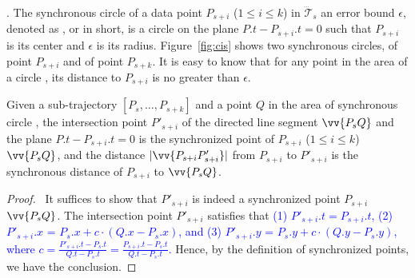 


. The synchronous circle of a data point $P_{s+i}$ ($1\le i\le k$) in $\dddot{\mathcal{T}}_s$ \wrt an error bound $\epsilon$, denoted as , or  in short, is a circle on the plane $P.t-P_{s+i}.t = 0$ such that $P_{s+i}$ is its center and $\epsilon$ is its radius.
%
Figure~\ref{fig:cis} shows two synchronous circles,  of point $P_{s+i}$ and  of point $P_{s+k}$.
It is easy to know that for any point in the area of a circle , its distance to $P_{s+i}$ is no greater than $\epsilon$.




\begin{prop}
\label{prop-3d-syn-point}
Given a sub-trajectory $[P_s, \ldots, P_{s+k}]$ and a point $Q$ in the area of synchronous circle , the intersection point $P'_{s+i}$ of the directed line segment $\vv{P_sQ}$ and the plane $P.t - P_{s+i}.t = 0$ is the synchronized point of $P_{s+i}$ ($1\le i\le k$) \wrt  $\vv{P_sQ}$, and the distance $|\vv{P_{s+i}P'_{s+i}}|$ from $P_{s+i}$ to $P'_{s+i}$ is the synchronous distance of $P_{s+i}$ to $\vv{P_sQ}$.
\end{prop}

\begin{proof}\ It suffices to show that $P'_{s+i}$ is indeed a synchronized point $P_{s+i}$ \wrt $\vv{P_sQ}$.
%
The intersection point $P'_{s+i}$ satisfies that 
\textcolor{blue}{
(1) $P'_{s+i}.t = P_{s+i}.t$, 
(2) $P'_{s+i}.x$ = $P_s.x +  c\cdot(Q.x - P_s.x)$, and
(3) $P'_{s+i}.y$ = $P_s.y +  c\cdot(Q.y - P_s.y)$, 
where $c= \frac{P'_{s+i}.t - P_{s}.t}{Q.t - P_{s}.t}= \frac{P_{s+i}.t-P_s.t}{Q.t-P_s.t}$.
}%
Hence, by the definition of synchronized points, we have the conclusion. \eop
\end{proof}




